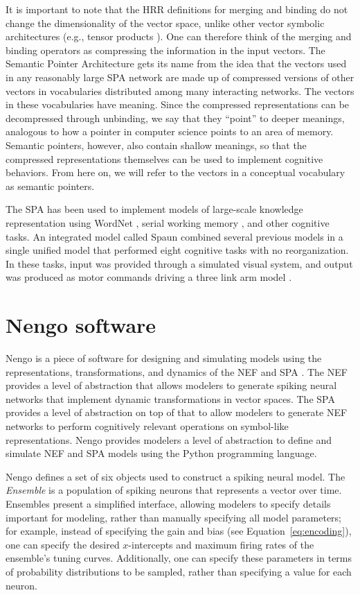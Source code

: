 It is important to note that
the HRR definitions for merging and binding
do not change the dimensionality
of the vector space,
unlike other vector symbolic architectures
(e.g., tensor products \citet{smolensky1990}).
One can therefore think of the
merging and binding operators
as compressing the information
in the input vectors.
The Semantic Pointer Architecture
gets its name from the idea that
the vectors used
in any reasonably large SPA network
are made up of compressed versions
of other vectors in vocabularies
distributed among many interacting networks.
The vectors in these vocabularies
have meaning.
Since the compressed representations
can be decompressed through unbinding,
we say that they ``point''
to deeper meanings,
analogous to how a pointer in computer science
points to an area of memory.
Semantic pointers, however,
also contain shallow meanings,
so that the compressed
representations themselves
can be used to implement cognitive behaviors.
From here on, we will refer to
the vectors in a conceptual vocabulary
as semantic pointers.

The SPA has been used to implement
models of large-scale knowledge representation
using WordNet \citep{crawford2014},
serial working memory \citep{choo2010},
and other cognitive tasks.
An integrated model called Spaun
combined several previous models
in a single unified model
that performed eight cognitive tasks
with no reorganization.
In these tasks, input was provided
through a simulated visual system,
and output was produced
as motor commands driving
a three link arm model
\citep{eliasmith2012,eliasmith2013}.

\section{Nengo software}
\label{sec:nengo}

Nengo is a piece of software
for designing and simulating
models using the representations,
transformations, and dynamics
of the NEF and SPA
\citep{bekolay2013}.
The NEF provides a level of abstraction
that allows modelers to generate
spiking neural networks
that implement dynamic transformations
in vector spaces.
The SPA provides a level of abstraction
on top of that
to allow modelers to generate
NEF networks to perform
cognitively relevant operations
on symbol-like representations.
Nengo provides modelers
a level of abstraction to
define and simulate NEF and SPA models
using the Python programming language.

Nengo defines a set of six objects
used to construct a spiking neural model.
The \textit{Ensemble} is
a population of spiking neurons
that represents a vector over time.
Ensembles present a simplified interface,
allowing modelers to specify
details important for modeling,
rather than manually specifying
all model parameters;
for example, instead of specifying
the gain and bias
(see Equation~\eqref{eq:encoding}),
one can specify the desired
$x$-intercepts and maximum firing rates
of the ensemble's tuning curves.
Additionally, one can specify
these parameters in terms of
probability distributions
to be sampled,
rather than specifying a value for each neuron.

